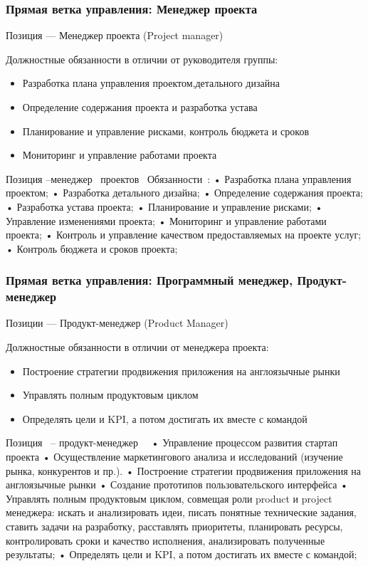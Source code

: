 \documentclass{../industrial-development}
\begin{document}
{\begin{frame} \frametitle{Прямая ветка управления: Менеджер проекта}
 \begin{block}{}
  \alert{Позиция --- Менеджер проекта (Project manager)}

Должностные обязанности в отличии от руководителя группы: 
  \end{block}
  \begin{itemize}
  \item Разработка плана управления проектом,детального дизайна
  \item Определение содержания проекта и разработка устава
 \item Планирование и управление рисками, контроль бюджета и сроков
  \item Мониторинг и управление работами проекта
  \end{itemize}
\end{frame}

\lecturenotes
Позиция –менеджер~\cite{hh} проектов~\cite{itcf}
Обязанности~\cite{rab}:
 • Разработка плана управления проектом;
• Разработка детального дизайна;
• Определение содержания проекта;
• Разработка устава проекта;
• Планирование и управление рисками;
• Управление изменениями проекта;
• Мониторинг и управление работами проекта;
• Контроль и управление качеством предоставляемых на проекте услуг;
• Контроль бюджета и сроков проекта;



\begin{frame} \frametitle{Прямая ветка управления: Программный менеджер, Продукт-менеджер}
 \begin{block}{}
  \alert{Позиции --- Продукт-менеджер (Product Manager)}

Должностные обязанности в отличии от менеджера проекта: 
  \end{block}
  \begin{itemize}
  \item Построение стратегии продвижения приложения на англоязычные рынки
  \item Управлять полным продуктовым циклом
 \item Определять цели и KPI, а потом достигать их вместе с командой
  \end{itemize}
\end{frame}

\lecturenotes

Позиция~\cite{hh} – продукт-менеджер~\cite{itcf}~\cite{rab}
•	Управление процессом развития стартап проекта 
•	Осуществление маркетингового анализа и исследований (изучение рынка, конкурентов и пр.).
•	Построение стратегии продвижения приложения на англоязычные рынки
•	Создание прототипов пользовательского интерфейса 
•	Управлять полным продуктовым циклом, совмещая роли product и project менеджера: искать и анализировать идеи, писать понятные технические задания, ставить задачи на разработку, расставлять приоритеты, планировать ресурсы, контролировать сроки и качество исполнения, анализировать полученные результаты;
•	Определять цели и KPI, а потом достигать их вместе с командой;



}
\end{document}

